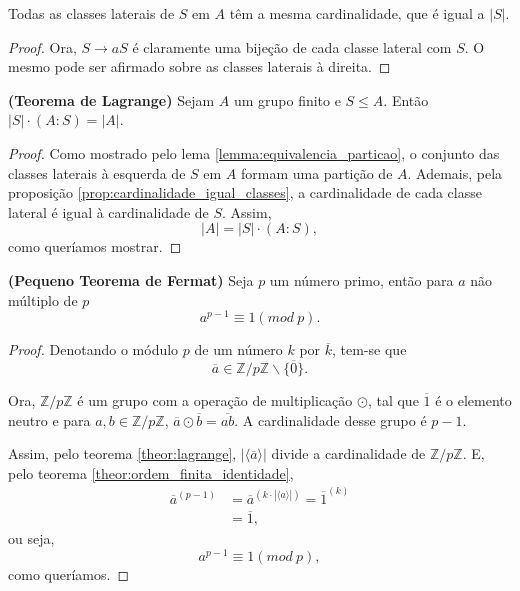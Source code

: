 \documentclass[11pt,openany]{book}
\newcommand{\gen}[1]{\ensuremath{\langle #1\rangle}}
\begin{document}
    \begin{proposition}
    \label{prop:cardinalidade_igual_classes}
        Todas as classes laterais de $S$ em $A$ têm a mesma cardinalidade, que é igual a $|S|$.
    \end{proposition}
    
    \begin{proof}
        Ora, $S \rightarrow aS$ é claramente uma bijeção de cada classe lateral com $S$. O mesmo pode ser afirmado sobre as classes laterais à direita.
    \end{proof}


    \begin{theorem}
    \label{theor:lagrange}
        \textbf{(Teorema de Lagrange)} Sejam $A$ um grupo finito e $S \leq A$. Então $|S|\cdot(A : S) = |A|$.
    \end{theorem}

    \begin{proof}
        Como mostrado pelo lema \ref{lemma:equivalencia_particao}, o conjunto das classes laterais à esquerda de $S$ em $A$ formam uma partição de $A$. Ademais, pela proposição \ref{prop:cardinalidade_igual_classes}, a cardinalidade de cada classe lateral é igual à cardinalidade de $S$. Assim,
        \[|A| = |S|\cdot(A : S),\]
        como queríamos mostrar.
    \end{proof}

    \begin{theorem}
    \label{theor:pequeno_teorema_fermat}
        \textbf{(Pequeno Teorema de Fermat)} Seja $p$ um número primo, então para $a$ não múltiplo de $p$
        \[a^{p-1} \equiv 1 (mod \ p).\]
    \end{theorem}
    
    \begin{proof}
        Denotando o módulo $p$ de um número $k$ por $\overline{k}$, tem-se que
        \[\overline{a} \in \mathbb{Z}/p\mathbb{Z} \backslash \{\overline{0}\}.\]
    
        Ora, $\mathbb{Z}/p\mathbb{Z}$ é um grupo com a operação de multiplicação $\odot$, tal que $\overline{1}$ é o elemento neutro e para $a,b \in \mathbb{Z}/p\mathbb{Z}$, $\overline{a}\odot\overline{b} = \overline{ab}$. A cardinalidade desse grupo é $p-1$.

        Assim, pelo teorema \ref{theor:lagrange}, $|\gen{\overline{a}}|$ divide a cardinalidade de $\mathbb{Z}/p\mathbb{Z}$. E, pelo teorema \ref{theor:ordem_finita_identidade},
        \begin{align*}
            \overline{a}^{(p-1)} &= \overline{a}^{(k\cdot|\gen{a}|)} = \overline{1}^{(k)}\\
            &= \overline{1},
        \end{align*}
        ou seja,
        \[a^{p-1} \equiv 1 (mod \ p),\]
        como queríamos.
    \end{proof}
\end{document}
